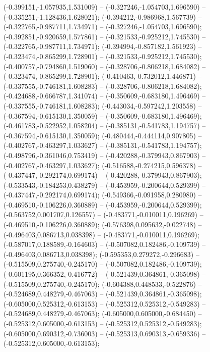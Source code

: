  (-0.399151,-1.057935,1.531009) -- (-0.327246,-1.054703,1.696590) -- (-0.335251,-1.128436,1.628021);
 (-0.394212,-0.986968,1.567739) -- (-0.322765,-0.987711,1.734971) -- (-0.327246,-1.054703,1.696590);
 (-0.392851,-0.920659,1.577861) -- (-0.321533,-0.925212,1.745530) -- (-0.322765,-0.987711,1.734971);
 (-0.394994,-0.857182,1.561923) -- (-0.323474,-0.865299,1.728901) -- (-0.321533,-0.925212,1.745530);
 (-0.400757,-0.794860,1.519060) -- (-0.328706,-0.806218,1.684082) -- (-0.323474,-0.865299,1.728901);
 (-0.410463,-0.732012,1.446871) -- (-0.337555,-0.746181,1.608283) -- (-0.328706,-0.806218,1.684082);
 (-0.424688,-0.666787,1.341074) -- (-0.350609,-0.683180,1.496469) -- (-0.337555,-0.746181,1.608283);
 (-0.443034,-0.597242,1.203558) -- (-0.367594,-0.615130,1.350059) -- (-0.350609,-0.683180,1.496469);
 (-0.461783,-0.522952,1.058204) -- (-0.385131,-0.541783,1.194757) -- (-0.367594,-0.615130,1.350059);
 (-0.480444,-0.444114,0.907805) -- (-0.402767,-0.463297,1.033627) -- (-0.385131,-0.541783,1.194757);
 (-0.498796,-0.361046,0.753419) -- (-0.420288,-0.379943,0.867903) -- (-0.402767,-0.463297,1.033627);
 (-0.516588,-0.274215,0.596378) -- (-0.437447,-0.292174,0.699174) -- (-0.420288,-0.379943,0.867903);
 (-0.533543,-0.184253,0.438279) -- (-0.453959,-0.200644,0.529399) -- (-0.437447,-0.292174,0.699174);
 (-0.549366,-0.091958,0.280980) -- (-0.469510,-0.106226,0.360889) -- (-0.453959,-0.200644,0.529399);
 (-0.563752,0.001707,0.126557) -- (-0.483771,-0.010011,0.196269) -- (-0.469510,-0.106226,0.360889);
 (-0.576398,0.095632,-0.022748) -- (-0.496403,0.086713,0.038398) -- (-0.483771,-0.010011,0.196269);
 (-0.587017,0.188589,-0.164603) -- (-0.507082,0.182486,-0.109739) -- (-0.496403,0.086713,0.038398);
 (-0.595353,0.279272,-0.296683) -- (-0.515509,0.275740,-0.245170) -- (-0.507082,0.182486,-0.109739);
 (-0.601195,0.366352,-0.416772) -- (-0.521439,0.364861,-0.365098) -- (-0.515509,0.275740,-0.245170);
 (-0.604388,0.448533,-0.522876) -- (-0.524689,0.448279,-0.467063) -- (-0.521439,0.364861,-0.365098);
 (-0.605000,0.525312,-0.613153) -- (-0.525312,0.525312,-0.549283) -- (-0.524689,0.448279,-0.467063);
 (-0.605000,0.605000,-0.684450) -- (-0.525312,0.605000,-0.613153) -- (-0.525312,0.525312,-0.549283);
 (-0.605000,0.690312,-0.736003) -- (-0.525313,0.690313,-0.659336) -- (-0.525312,0.605000,-0.613153);
